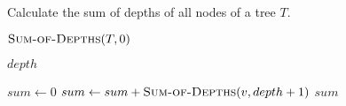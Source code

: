 
\begin{algorithm}[H]
  \caption{Calculate the sum of depths of all nodes of a tree $T$.}
  \label{alg:sum-of-depths}
  \begin{algorithmic}[1]
      \State \Return $\Call{Sum-of-Depths}{T, 0}$ 
    \EndProcedure

    \Statex
     
        \State \Return $depth$
      \EndIf

      \hStatex
      \State $sum\gets 0$
	\State $sum\gets sum+ \Call{Sum-of-Depths}{v, depth + 1}$
      \EndFor
      \State \Return $sum$
    \EndProcedure
  \end{algorithmic}
\end{algorithm}
